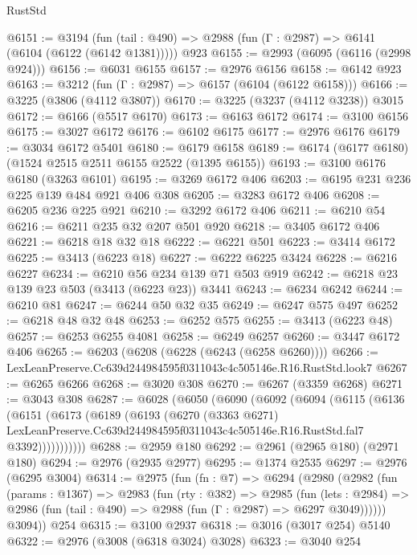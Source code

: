 \begin{lexlean}{RustStd}
\begin{coremodule}
@6151 := @3194
    (fun (tail : @490) => @2988 (fun (Γ : @2987) => @6141 (@6104 (@6122 (@6142 @1381)))))
    @923
@6155 := @2993 (@6095 (@6116 (@2998 @924)))
@6156 := @6031 @6155
@6157 := @2976 @6156
@6158 := @6142 @923
@6163 := @3212 (fun (Γ : @2987) => @6157 (@6104 (@6122 @6158)))
@6166 := @3225 (@3806 (@4112 @3807))
@6170 := @3225 (@3237 (@4112 @3238)) @3015
@6172 := @6166 (@5517 @6170)
@6173 := @6163 @6172
@6174 := @3100 @6156
@6175 := @3027 @6172
@6176 := @6102 @6175
@6177 := @2976 @6176
@6179 := @3034 @6172 @5401
@6180 := @6179 @6158
@6189 := @6174 (@6177 @6180) (@1524 @2515 @2511 @6155 @2522 (@1395 @6155))
@6193 := @3100 @6176 @6180 (@3263 @6101)
@6195 := @3269 @6172 @406
@6203 := @6195 @231 @236 @225 @139 @484 @921 @406 @308
@6205 := @3283 @6172 @406
@6208 := @6205 @236 @225 @921
@6210 := @3292 @6172 @406
@6211 := @6210 @54
@6216 := @6211 @235 @32 @207 @501 @920
@6218 := @3405 @6172 @406
@6221 := @6218 @18 @32 @18
@6222 := @6221 @501
@6223 := @3414 @6172
@6225 := @3413 (@6223 @18)
@6227 := @6222 @6225 @3424
@6228 := @6216 @6227
@6234 := @6210 @56 @234 @139 @71 @503 @919
@6242 := @6218 @23 @139 @23 @503 (@3413 (@6223 @23)) @3441
@6243 := @6234 @6242
@6244 := @6210 @81
@6247 := @6244 @50 @32 @35
@6249 := @6247 @575 @497
@6252 := @6218 @48 @32 @48
@6253 := @6252 @575
@6255 := @3413 (@6223 @48)
@6257 := @6253 @6255 @4081
@6258 := @6249 @6257
@6260 := @3447 @6172 @406
@6265 := @6203 (@6208 (@6228 (@6243 (@6258 @6260))))
@6266 := LexLeanPreserve.Cc639d244984595f0311043c4c505146e.R16.RustStd.look7
@6267 := @6265 @6266
@6268 := @3020 @308
@6270 := @6267 (@3359 @6268)
@6271 := @3043 @308
@6287 := @6028
    (@6050
      (@6090
        (@6092
          (@6094
            (@6115
              (@6136
                (@6151
                  (@6173
                    (@6189
                      (@6193
                        (@6270
                          (@3363 @6271)
                          LexLeanPreserve.Cc639d244984595f0311043c4c505146e.R16.RustStd.fal7
                          @3392)))))))))))
@6288 := @2959 @180
@6292 := @2961 (@2965 @180) (@2971 @180)
@6294 := @2976 (@2935 @2977)
@6295 := @1374 @2535
@6297 := @2976 (@6295 @3004)
@6314 := @2975
    (fun (fn : @7) =>
    @6294
      (@2980
        (@2982
          (fun (params : @1367) =>
          @2983
            (fun (rty : @382) =>
            @2985
              (fun (lets : @2984) =>
              @2986 (fun (tail : @490) => @2988 (fun (Γ : @2987) => @6297 @3049))))))
        @3094))
    @254
@6315 := @3100 @2937
@6318 := @3016 (@3017 @254) @5140
@6322 := @2976 (@3008 (@6318 @3024) @3028)
@6323 := @3040 @254

\end{coremodule}
\end{lexlean}
